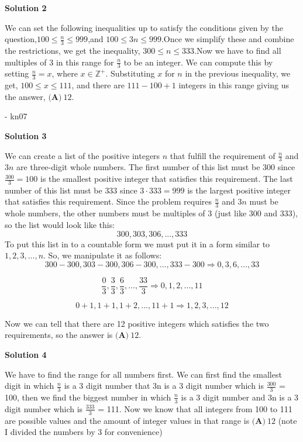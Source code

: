 \begin{enumerate}
\textbf{Solution 2}

We can set the following inequalities up to satisfy the conditions given by the question,$100 \leq \frac{n}{3} \leq 999$,and $100 \leq 3n \leq 999$.Once we simplify these and combine the restrictions, we get the inequality, $300 \leq n \leq 333$.Now we have to find all multiples of 3 in this range for $\frac{n}{3}$ to be an integer. We can compute this by setting $\frac{n} {3}=x$, where $x \in \mathbb{Z^+}$. Substituting $x$ for $n$ in the previous inequality, we get, $100 \leq x \leq 111$, and there are $111-100+1$ integers in this range giving us the answer, $\boxed{\textbf{(A)}\ 12}$.

 - kn07

 



\textbf{Solution 3}

We can create a list of the positive integers $n$ that fulfill the requirement of $\frac {n}{3}$ and $3n$ are three-digit whole numbers. The first number of this list must be $300$ since $\frac {300}{3} = 100$ is the smallest positive integer that satisfies this requirement. The last number of this list must be $333$ since $3 \cdot 333 = 999$ is the largest positive integer that satisfies this requirement. Since the problem requires $\frac {n}{3}$ and $3n$ must be whole numbers, the other numbers must be multiples of 3 (just like 300 and 333), so the list would look like this:
 \[300, 303, 306, . . . , 333\]To put this list in to a countable form we must put it in a form similar to $1,2,3, . . ., n$. So, we manipulate it as follows:
 \[300-300,303-300,306-300, . . .,333-300 \Rightarrow 0,3,6, . . ., 33\]

 \[\frac{0}{3}, \frac{3}{3}, \frac{6}{3}, . . ., \frac{33}{3} \Rightarrow 0,1,2, . . ., 11\]

 \[0+1,1+1,1+2, . . ., 11+1 \Rightarrow 1,2,3, . . ., 12\]

 Now we can tell that there are 12 positive integers which satisfies the two requirements, so the answer is $\boxed{\textbf{(A)}\ 12}$.

 



\textbf{Solution 4}

We have to find the range for all numbers first. We can first find the smallest digit in which $\frac {n}{3}$ is a 3 digit number that 3n is a 3 digit number which is $\frac {300}{3}$ = 100, then we find the biggest number in which $\frac {n}{3}$ is a 3 digit number and 3n is a 3 digit number which is $\frac {333}{3}$ = 111. Now we know that all integers from 100 to 111 are possible values and the amount of integer values in that range is $\boxed{\textbf{(A)}\ 12}$ (note I divided the numbers by 3 for convenience)


\end{enumerate}
